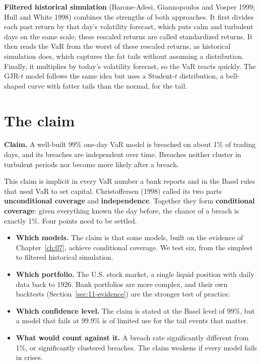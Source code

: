 \textbf{Filtered historical simulation} (Barone-Adesi, Giannopoulos and Vosper 1999; Hull and White 1998) combines the strengths of both approaches. It first divides each past return by that day's volatility forecast, which puts calm and turbulent days on the same scale; these rescaled returns are called standardized returns. It then reads the VaR from the worst of these rescaled returns, as historical simulation does, which captures the fat tails without assuming a distribution. Finally, it multiplies by today's volatility forecast, so the VaR reacts quickly. The GJR-$t$ model follows the same idea but uses a Student-$t$ distribution, a bell-shaped curve with fatter tails than the normal, for the tail.



\section{The claim}
\label{sec:11-claim}

\begin{callout}
\textbf{Claim.} A well-built 99\% one-day VaR model is breached on about 1\% of trading days, and its breaches are independent over time. Breaches neither cluster in turbulent periods nor become more likely after a breach.
\end{callout}

This claim is implicit in every VaR number a bank reports and in the Basel rules that used VaR to set capital. Christoffersen (1998) called its two parts \textbf{unconditional coverage} and \textbf{independence}. Together they form \textbf{conditional coverage}: given everything known the day before, the chance of a breach is exactly 1\%. Four points need to be settled.

\begin{itemize}
  \item \textbf{Which models.} The claim is that some models, built on the evidence of Chapter~\ref{ch:07}, achieve conditional coverage. We test six, from the simplest to filtered historical simulation.
  \item \textbf{Which portfolio.} The U.S. stock market, a single liquid position with daily data back to 1926. Bank portfolios are more complex, and their own backtests (Section~\ref{sec:11-evidence}) are the stronger test of practice.
  \item \textbf{Which confidence level.} The claim is stated at the Basel level of 99\%, but a model that fails at 99.9\% is of limited use for the tail events that matter.
  \item \textbf{What would count against it.} A breach rate significantly different from 1\%, or significantly clustered breaches. The claim weakens if every model fails in crises.
\end{itemize}

